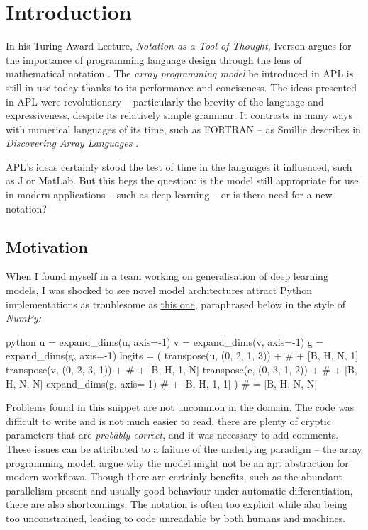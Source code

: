 \chapter{Introduction}

In his Turing Award Lecture, \textit{Notation as a Tool of Thought}, Iverson argues for the importance of programming language design through the lens of mathematical notation  \cite{iverson2007notation}. The \textit{array programming model} he introduced in APL is still in use today thanks to its performance and conciseness. The ideas presented in APL were revolutionary -- particularly the brevity of the language and expressiveness, despite its relatively simple grammar. It contrasts in many ways with numerical languages of its time, such as FORTRAN -- as Smillie describes in \textit{Discovering Array Languages} \cite{smillie2000lecture}. 

APL's ideas certainly stood the test of time in the languages it influenced, such as J or MatLab. But this begs the question: is the model still appropriate for use in modern applications -- such as deep learning -- or is there need for a new notation?

\section{Motivation}

When I found myself in a team working on generalisation of deep learning models, I was shocked to see novel model architectures attract Python implementations as troublesome as \href{https://github.com/google-deepmind/clrs/blob/8697f51663bd77548f4b3108816c84d163883361/clrs/_src/processors.py#L140}{this one}, paraphrased below in the style of \textit{NumPy:}
\begin{center}
\begin{cminted}{python}
u = expand_dims(u, axis=-1)
v = expand_dims(v, axis=-1)
g = expand_dims(g, axis=-1)
logits = (
    transpose(u, (0, 2, 1, 3)) +  # + [B, H, N, 1]
    transpose(v, (0, 2, 3, 1)) +  # + [B, H, 1, N]
    transpose(e, (0, 3, 1, 2)) +  # + [B, H, N, N]
    expand_dims(g, axis=-1)       # + [B, H, 1, 1]
)                                 # = [B, H, N, N]
\end{cminted}
\end{center}
Problems found in this snippet are not uncommon in the domain. The code was difficult to write and is not much easier to read, there are plenty of cryptic parameters that are \textit{probably correct}, and it was necessary to add comments. These issues can be attributed to a failure of the underlying paradigm -- the array programming model. \textcite{paszke2021getting} argue why the model might not be an apt abstraction for modern workflows. Though there are certainly benefits, such as the abundant parallelism present and usually good behaviour under automatic differentiation, there are also shortcomings. The notation is often too explicit while also being too unconstrained, leading to code unreadable by both humans and machines. 


